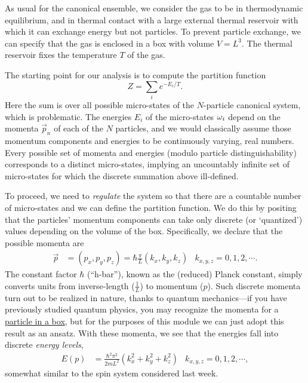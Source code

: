 As usual for the canonical ensemble, we consider the gas to be in thermodynamic equilibrium, and in thermal contact with a large external thermal reservoir with which it can exchange energy but not particles.
To prevent particle exchange, we can specify that the gas is enclosed in a box with volume $V = L^3$.
The thermal reservoir fixes the temperature $T$ of the gas.

The starting point for our analysis is to compute the partition function
\begin{equation*}
  Z = \sum_i e^{-E_i / T}.
\end{equation*}
Here the sum is over all possible micro-states of the $N$-particle canonical system, which is problematic.
The energies $E_i$ of the micro-states $\omega_i$ depend on the momenta $\vec{p}_n$ of each of the $N$ particles, and we would classically assume those momentum components and energies to be continuously varying, real numbers.
Every possible set of momenta and energies (modulo particle distinguishability) corresponds to a distinct micro-states, implying an uncountably infinite set of micro-states for which the discrete summation above ill-defined.

To proceed, we need to \textit{regulate} the system so that there are a countable number of micro-states and we can define the partition function.
We do this by positing that the particles' momentum components can take only discrete (or `quantized') values depending on the volume of the box.
Specifically, we declare that the possible momenta are
\begin{align*}
  \vec p & = (p_x, p_y, p_z) = \hbar \frac{\pi}{L} (k_x, k_y, k_z) &
  k_{x, y, z} = 0, 1, 2, \cdots.
\end{align*}
The constant factor $\hbar$ (``h-bar''), known as the (reduced) Planck constant, simply converts units from inverse-length ($\frac{1}{L}$) to momentum ($p$).
Such discrete momenta turn out to be realized in nature, thanks to quantum mechanics---if you have previously studied quantum physics, you may recognize the momenta for a \href{https://en.wikipedia.org/wiki/Particle_in_a_box}{particle in a box}, but for the purposes of this module we can just adopt this result as an ansatz.
With these momenta, we see that the energies fall into discrete \textit{energy levels},
\begin{align*}
  E(p) & = \frac{\hbar^2 \pi^2}{2mL^2} (k_x^2 + k_y^2 + k_z^2) &
  k_{x, y, z} = 0, 1, 2, \cdots,
\end{align*}
somewhat similar to the spin system considered last week.

